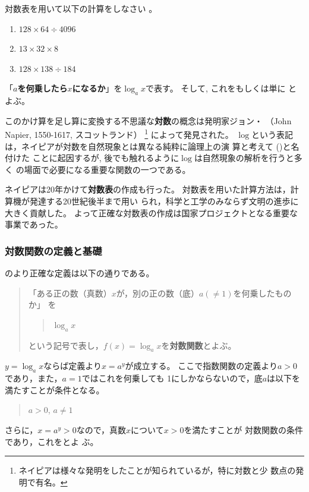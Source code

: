 \documentclass[twocolumn,11pt]{jarticle}
\begin{document}
\nquestion
対数表を用いて以下の計算をしなさい
。
\begin{enumerate}
\item\label{item:128x64/4096} $128\times 64\div 4096$
\item\label{item:13x32x8} $13\times 32\times 8$
\item\label{item:128x138/184} $128\times 138\div 184$%
\end{enumerate}

\comment
「\textbf{$a$を何乗したら$x$になるか}」を$\log_ax$で表す。
そして, これをもしくは単に
とよぶ。

このかけ算を足し算に変換する不思議な\textbf{対数}の概念は発明家ジョン・
（John Napier, 1550-1617, スコットランド）
\footnote{ネイピアは様々な発明をしたことが知られているが，特に対数と少
  数点の発明で有名。}
によって発見された。
$\log$という表記は，ネイピアが対数を自然現象とは異なる純粋に論理上の演
算と考えて ()と名付けた
ことに起因するが, 後でも触れるように$\log$は自然現象の解析を行うと多く
の場面で必要になる重要な関数の一つである。

ネイピアは20年かけて\textbf{対数表}の作成も行った。
対数表を用いた計算方法は，計算機が発達する20世紀後半まで用い
られ，科学と工学のみならず文明の進歩に大きく貢献した。
よって正確な対数表の作成は国家プロジェクトとなる重要な事業であった。


\subsubsection{対数関数の定義と基礎\label{sec:log-formula}}
のより正確な定義は以下の通りである。
\begin{quote}
「ある正の数（真数）$x$が，別の正の数（底）$a(\ne 1)$を何乗したものか」
を
\begin{quote}
  $\log_a x$
\end{quote}
という記号で表し，$f(x)=\log_a x$を\textbf{対数関数}とよぶ。
\end{quote}
$y=\log_a x$ならば定義より$x=a^y$が成立する。
ここで指数関数の定義より$a>0$であり，また，$a=1$ではこれを何乗しても
1にしかならないので，底$a$は以下を満たすことが条件となる。
\begin{quote}
  $a>0$, $a\ne 1$
\end{quote}
さらに，$x=a^y>0$なので，真数$x$について$x>0$を満たすことが
対数関数の条件であり，これをとよ
ぶ。
\end{document}
